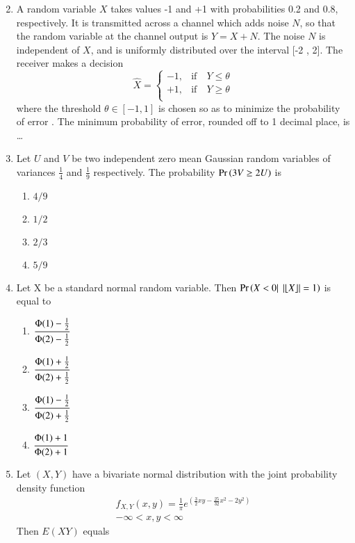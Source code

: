 \begin{enumerate}[label=\thesection.\arabic*.,ref=\thesection.\theenumi]
\begin{enumerate}
\begin{multicols}{2}
\end{multicols}
\end{enumerate}

\item A random variable $X$ takes values -1 and +1 with probabilities 0.2 and 0.8, respectively.
It is transmitted across a channel which adds noise $N$, so that the random variable at the
channel output is $Y = X + N$. The noise $N$ is independent of $X$, and is uniformly
distributed over the interval [-2 , 2]. The receiver makes a decision
\[
\hat{X} = \begin{cases}
            -1, &\text{if}\quad Y \leq \theta \\
             +1, &\text{if}\quad Y \geq \theta\\
            \end{cases}
\]
where the threshold $\theta  \in [-1,1]$ is chosen so as to minimize the probability of error
. The minimum probability of error, rounded off to 1 decimal place, is \dots
\\
\solution


%
\item  Let $U$ and $V$ be two independent zero mean Gaussian random variables of variances $\frac{1}{4}$ and $\frac{1}{9}$ respectively. The probability $\Pr\left(3V\geq2U \right)$ is
\begin{enumerate}
    \item $4/9$
    \item $1/2$
    \item $2/3$
    \item $5/9$
\end{enumerate}
%
\solution

%
%
\item Let X be a standard normal random variable. Then $\Pr\left(X < 0 |\;\left\vert\lfloor X\rfloor\right\vert = 1\right)$ is equal to
\begin{enumerate}[label = \alph*)]
    \item $\cfrac{\Phi(1) - \frac{1}{2}}{\Phi(2) - \frac{1}{2}}$
    \item $\cfrac{\Phi(1) + \frac{1}{2}}{\Phi(2) + \frac{1}{2}}$
    \item $\cfrac{\Phi(1) - \frac{1}{2}}{\Phi(2) + \frac{1}{2}}$
    \item $\cfrac{\Phi(1) + 1}{\Phi(2) + 1}$
\end{enumerate}
%
\solution

%
\item Let $(X,Y)$ have a bivariate normal distribution with the joint probability density function
\begin{align}
f_{X,Y}(x,y)=\frac{1}{\pi}e^{(\frac{3}{2}xy-\frac{25}{32}x^2-2y^2)}\\
-\infty < x,y < \infty
\end{align}
Then $E(XY)$ equals 
%
\\
\solution
  


\end{enumerate}
